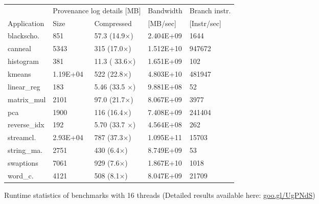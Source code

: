 \begin{figure}[t]
\centering
\myfontsize
\newcommand{\tworowcell}[2][c]{\begin{tabular}[#1]{@{}c@{}}#2\end{tabular}}
{
\begin{tabular}{m{1cm}|m{1cm}|m{1.4cm}|m{1.25cm}|m{1.25cm}}
 &   \multicolumn{2}{c|}{ Provenance log details [MB] }   &  Bandwidth & Branch instr. \\
   { Application} & Size & Compressed & [MB/sec] &  [Instr/sec] \\
  \hline \hline
    blackscho. 	&	851		& 57.3 	(14.9$\times$)	&  2.404E+09& 1644  \\
    canneal  	&	5343		& 315  	(17.0$\times$)	&  1.512E+10& 947672   \\
    histogram 	&	381 		&  11.3	( 33.6$\times$)	&  1.651E+09& 102   \\
    kmeans 	&	1.19E+04 	& 522	(22.8$\times$)	&  4.803E+10& 481947   \\
    linear\_reg 	&	183 		& 5.46	(33.5	$\times$)	&  9.881E+08& 52   \\
    matrix\_mul 	&	2101  	& 97.0	(21.7$\times$)	&  8.067E+09& 3977   \\
    pca		& 	1900 	& 116	(16.4$\times$)	&  7.408E+09& 241404   \\
    reverse\_idx	&	192 		& 5.70	(33.7	$\times$)	&  4.564E+08& 262  \\
    streamcl.	&	2.93E+04 & 787	(37.3$\times$)	&  1.095E+11& 15703  \\
    string\_ma.	&	2751		& 430	(6.4$\times$)	&  8.749E+09& 53  \\
    swaptions	&	7061		& 929	(7.6$\times$)	&  1.867E+10& 1018  \\
    word\_c.	&	4121		& 508	(8.1$\times$)	&  8.047E+09& 21709  \\
\hline
\end{tabular}
}

\caption{Runtime statistics of benchmarks with 16 threads (Detailed results available here: \href{https://goo.gl/UgPNdS}{goo.gl/UgPNdS}) }
\label{tab:apps}
\end{figure}
